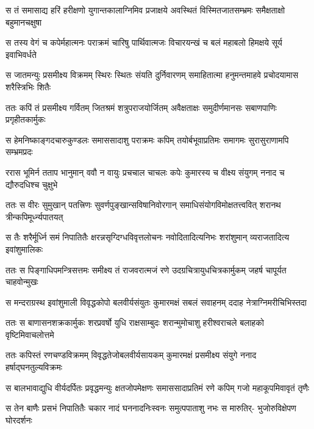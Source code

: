 \fourlineindentedshloka
{स तं समासाद्य हरिं हरीक्षणो}
{युगान्तकालाग्निमिव प्रजाक्षये}
{अवस्थितं विस्मितजातसम्भ्रमः}
{समैक्षताक्षो बहुमानचक्षुषा} %

\fourlineindentedshloka
{स तस्य वेगं च कपेर्महात्मनः}
{पराक्रमं चारिषु पार्थिवात्मजः}
{विचारयन्खं च बलं महाबलो}
{हिमक्षये सूर्य इवाभिवर्धते} %

\fourlineindentedshloka
{स जातमन्युः प्रसमीक्ष्य विक्रमम्}
{स्थिरः स्थितः संयति दुर्निवारणम्}
{समाहितात्मा हनुमन्तमाहवे}
{प्रचोदयामास शरैस्त्रिभिः शितैः} %

\fourlineindentedshloka
{ततः कपिं तं प्रसमीक्ष्य गर्वितम्}
{जितश्रमं शत्रुपराजयोर्जितम्}
{अवैक्षताक्षः समुदीर्णमानसः}
{सबाणपाणिः प्रगृहीतकार्मुकः} %

\fourlineindentedshloka
{स हेमनिष्काङ्गदचारुकुण्डलः}
{समाससादाशु पराक्रमः कपिम्}
{तयोर्बभूवाप्रतिमः समागमः}
{सुरासुराणामपि सम्भ्रमप्रदः} %

\fourlineindentedshloka
{ररास भूमिर्न तताप भानुमान्}
{ववौ न वायुः प्रचचाल चाचलः}
{कपेः कुमारस्य च वीक्ष्य संयुगम्}
{ननाद च द्यौरुदधिश्च चुक्षुभे} %

\fourlineindentedshloka
{ततः स वीरः सुमुखान् पतत्त्रिणः}
{सुवर्णपुङ्खान्सविषानिवोरगान्}
{समाधिसंयोगविमोक्षतत्त्ववित्}
{शरानथ त्रीन्कपिमूर्ध्न्यपातयत्} %

\fourlineindentedshloka
{स तैः शरैर्मूर्ध्नि समं निपातितैः}
{क्षरन्नसृग्दिग्धविवृत्तलोचनः}
{नवोदितादित्यनिभः शरांशुमान्}
{व्यराजतादित्य इवांशुमालिकः} %

\fourlineindentedshloka
{ततः स पिङ्गाधिपमन्त्रिसत्तमः}
{समीक्ष्य तं राजवरात्मजं रणे}
{उदग्रचित्रायुधचित्रकार्मुकम्}
{जहर्ष चापूर्यत चाहवोन्मुखः} %

\fourlineindentedshloka
{स मन्दराग्रस्थ इवांशुमाली}
{विवृद्धकोपो बलवीर्यसंयुतः}
{कुमारमक्षं सबलं सवाहनम्}
{ददाह नेत्राग्निमरीचिभिस्तदा} %

\fourlineindentedshloka
{ततः स बाणासनशक्रकार्मुकः}
{शरप्रवर्षो युधि राक्षसाम्बुदः}
{शरान्मुमोचाशु हरीश्वराचले}
{बलाहको वृष्टिमिवाचलोत्तमे} %

\fourlineindentedshloka
{ततः कपिस्तं रणचण्डविक्रमम्}
{विवृद्धतेजोबलवीर्यसायकम्}
{कुमारमक्षं प्रसमीक्ष्य संयुगे}
{ननाद हर्षाद्घनतुल्यविक्रमः} %

\fourlineindentedshloka
{स बालभावाद्युधि वीर्यदर्पितः}
{प्रवृद्धमन्युः क्षतजोपमेक्षणः}
{समाससादाप्रतिमं रणे कपिम्}
{गजो महाकूपमिवावृतं तृणैः} %

\fourlineindentedshloka
{स तेन बाणैः प्रसभं निपातितैः}
{चकार नादं घननादनिःस्वनः}
{समुत्पपाताशु नभः स मारुतिर्-}
{भुजोरुविक्षेपण घोरदर्शनः} %

